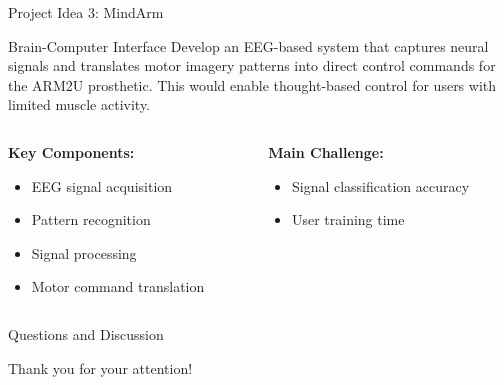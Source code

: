 \documentclass{beamer}
\begin{document}
\begin{frame}{Project Idea 3: MindArm}
    \begin{block}{Brain-Computer Interface}
        Develop an EEG-based system that captures neural signals and translates motor imagery patterns into direct control commands for the ARM2U prosthetic. This would enable thought-based control for users with limited muscle activity.
    \end{block}

    \vspace{0.5cm}

    \begin{columns}[T]
        \begin{column}{0.5\textwidth}
            \textbf{Key Components:}
            \begin{itemize}
                \item EEG signal acquisition
                \item Pattern recognition
                \item Signal processing
                \item Motor command translation
            \end{itemize}
        \end{column}

        \begin{column}{0.5\textwidth}
            \textbf{Main Challenge:}
            \begin{itemize}
                \item Signal classification accuracy
                \item User training time
            \end{itemize}
        \end{column}
    \end{columns}
\end{frame}


\begin{frame}
    \vspace{2cm}

    \begin{center}
        {\Huge Questions and Discussion}
    \end{center}

    \vspace{2cm}

    \begin{center}
        \Large
        Thank you for your attention!
    \end{center}

    \vspace{1cm}
\end{frame}
\end{document}
